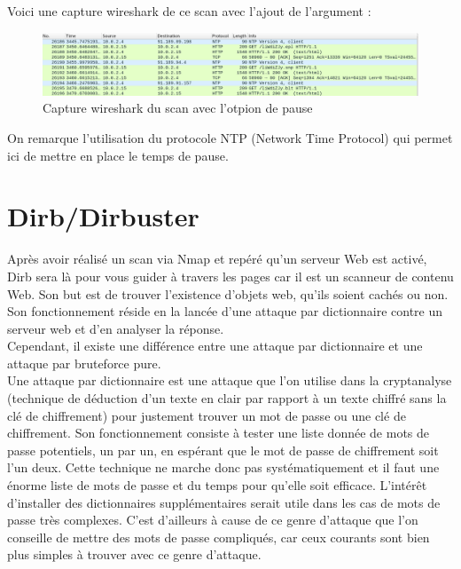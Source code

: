 Voici une capture wireshark de ce scan avec l'ajout de l'argument :

\begin{figure}[htp!]
  \centering
  \setlength\figureheight{7cm}
  \setlength\figurewidth{9cm}
  \includegraphics[width=1\textwidth]{oui/Ancien/imangeancien/Nikto/wireshark4.PNG}
  \caption{Capture wireshark du scan avec l'otpion de pause}
  \label{fig:courbe-tikz}
\end{figure}

 On remarque l'utilisation du protocole NTP (Network Time Protocol) qui permet ici de mettre en place le temps de pause.
\newpage

\section{Dirb/Dirbuster}

Après avoir réalisé un scan via Nmap et repéré qu'un serveur Web est activé, Dirb sera là pour vous guider à travers les pages car il est un scanneur de contenu Web. Son but est de trouver l’existence d’objets web, qu’ils soient cachés ou non.
Son fonctionnement réside en la lancée d’une attaque par dictionnaire contre un serveur web et d’en analyser la réponse. \\
Cependant, il existe une différence entre une attaque par dictionnaire et une attaque par bruteforce pure.\\
Une attaque par dictionnaire est une attaque que l’on utilise dans la cryptanalyse (technique de déduction d’un texte en clair par rapport à un texte chiffré sans la clé de chiffrement) pour justement trouver un mot de passe ou une clé de chiffrement. 
Son fonctionnement consiste à tester une liste donnée de mots de passe potentiels, un par un, en espérant que le mot de passe de chiffrement soit l’un deux. 
Cette technique ne marche donc pas systématiquement et il faut une énorme liste de mots de passe et du temps pour qu’elle soit efficace. L'intérêt d'installer des dictionnaires supplémentaires serait utile dans les cas de mots de passe très complexes.
C’est d’ailleurs à cause de ce genre d’attaque que l’on conseille de mettre des mots de passe compliqués, car ceux courants sont bien plus simples à trouver avec ce genre d’attaque. 

